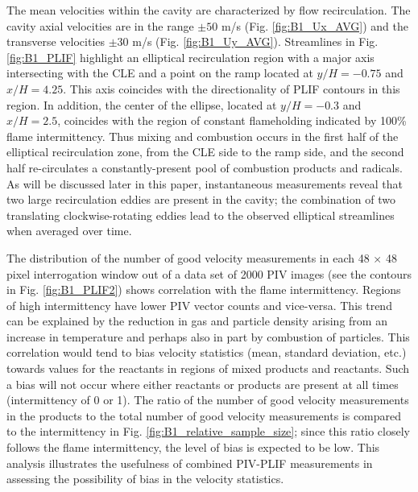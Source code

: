 The mean velocities within the cavity are characterized by flow recirculation. The cavity axial velocities are in the range $\pm 50$ m/s (Fig. \ref{fig:B1_Ux_AVG}) and the transverse velocities $\pm 30$ m/s (Fig. \ref{fig:B1_Uy_AVG}). Streamlines in Fig. \ref{fig:B1_PLIF} highlight an elliptical recirculation region with a major axis intersecting with the CLE and a point on the ramp located at $y/H=-0.75$ and $x/H=4.25$. This axis coincides with the directionality of PLIF contours in this region. In addition, the center of the ellipse, located at $y/H=-0.3$ and $x/H=2.5$, coincides with the region of constant flameholding indicated by 100\% flame intermittency. Thus mixing and combustion occurs in the first half of the elliptical recirculation zone, from the CLE side to the ramp side, and the second half re-circulates a constantly-present pool of combustion products and radicals. As will be discussed later in this paper, instantaneous measurements reveal that two large recirculation eddies are present in the cavity; the combination of two translating clockwise-rotating eddies lead to the observed elliptical streamlines when averaged over time.

The distribution of the number of good velocity measurements in each 48 $\times$ 48 pixel interrogation window out of a data set of 2000 PIV images (see the contours in Fig. \ref{fig:B1_PLIF2}) shows correlation with the flame intermittency. Regions of high intermittency have lower PIV vector counts and vice-versa. This trend can be explained by the reduction in gas and particle density arising from an increase in temperature and perhaps also in part by combustion of particles. This correlation would tend to bias velocity statistics (mean, standard deviation, etc.) towards values for the reactants in regions of mixed products and reactants.  Such a bias will not occur where either reactants or products are present at all times (intermittency of 0 or 1). The ratio of the number of good velocity measurements in the products to the total number of good velocity measurements is compared to the intermittency in Fig. \ref{fig:B1_relative_sample_size}; since this ratio closely follows the flame intermittency, the level of bias is expected to be low. This analysis illustrates the usefulness of combined PIV-PLIF measurements in assessing the possibility of bias in the velocity statistics.


